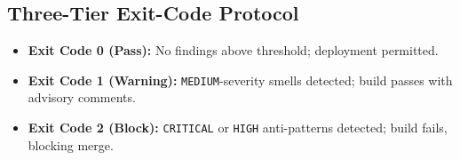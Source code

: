 \subsection{Three-Tier Exit-Code Protocol}
\label{sec:cicd:protocol}

\begin{itemize}
    \item \textbf{Exit Code 0 (Pass):} No findings above threshold; deployment permitted.
    \item \textbf{Exit Code 1 (Warning):} \texttt{MEDIUM}-severity smells detected; build passes with advisory comments.
    \item \textbf{Exit Code 2 (Block):} \texttt{CRITICAL} or \texttt{HIGH} anti-patterns detected; build fails, blocking merge.
\end{itemize}
